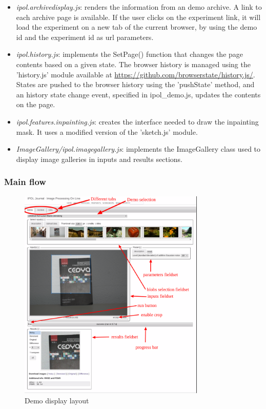\begin{itemize}
 \item \emph{ipol.archivedisplay.js}: renders the information from an demo archive.
  A link to each archive page is available. If the user clicks on the experiment
  link, it will load the experiment on a new tab of the current browser, by using
  the demo id and the experiment id as url parameters.

 \item \emph{ipol.history.js}: implements the SetPage() function that
  changes the page contents based on a given state. The browser history is 
  managed using the 'history.js' module available at 
  \url{https://github.com/browserstate/history.js/}.
  States are pushed to the browser history using the 'pushState' method, 
  and an history state change event, specified in ipol\_demo.js, updates
  the contents on the page.

 \item \emph{ipol.features.inpainting.js}: creates the interface needed to draw
  the inpainting mask. It uses a modified version of the 'sketch.js' module.

  \item \emph{ImageGallery/ipol.imagegallery.js}: implements the ImageGallery class
  used to display image galleries in inputs and results sections.

\end{itemize}

\subsubsection{Main flow}

\begin{figure}[H]
  \centering
  \includegraphics[width=3.5in]{Images/demo_capture}
  \caption{Demo display layout}
  \label{img:demo_snapshot}
\end{figure}

